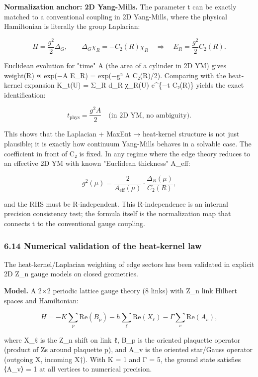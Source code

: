 \textbf{Normalization anchor: 2D Yang-Mills.} The parameter t can be exactly matched to a conventional coupling in 2D Yang-Mills, where the physical Hamiltonian is literally the group Laplacian:

\[
H = \frac{g^2}{2} \Delta_G, \qquad
\Delta_G \chi_R = -C_2(R) \chi_R
\quad \Rightarrow \quad
E_R = \frac{g^2}{2} C_2(R).
\]

Euclidean evolution for "time" A (the area of a cylinder in 2D YM) gives weight(R) ∝ exp(−A E\_R) = exp(−g² A C₂(R)/2). Comparing with the heat-kernel expansion K\_t(U) = Σ\_R d\_R χ\_R(U) e\^{}\{−t C₂(R)\} yields the exact identification:

\[
t_\mathrm{phys} = \frac{g^2 A}{2} \quad \text{(in 2D YM, no ambiguity).}
\]

This shows that the Laplacian + MaxEnt → heat-kernel structure is not just plausible; it is exactly how continuum Yang-Mills behaves in a solvable case. The coefficient in front of C₂ is fixed. In any regime where the edge theory reduces to an effective 2D YM with known "Euclidean thickness" A\_eff:

\[
g^2(\mu) = \frac{2}{A_\mathrm{eff}(\mu)} \cdot \frac{\Delta_R(\mu)}{C_2(R)},
\]

and the RHS must be R-independent. This R-independence is an internal precision consistency test; the formula itself is the normalization map that connects t to the conventional gauge coupling.

\subsubsection{6.14 Numerical validation of the heat-kernel law}\label{614-numerical-validation-of-the-heat-kernel-law}

The heat-kernel/Laplacian weighting of edge sectors has been validated in explicit 2D Z\_n gauge models on closed geometries.

\textbf{Model.} A 2×2 periodic lattice gauge theory (8 links) with Z\_n link Hilbert spaces and Hamiltonian:

\[
H = -K \sum_p \mathrm{Re}(B_p) - h \sum_\ell \mathrm{Re}(X_\ell) - \Gamma \sum_v \mathrm{Re}(A_v),
\]

where X\_ℓ is the Z\_n shift on link ℓ, B\_p is the oriented plaquette operator (product of Z\textquotesingle s around plaquette p), and A\_v is the oriented star/Gauss operator (outgoing X, incoming X†). With K = 1 and Γ = 5, the ground state satisfies ⟨A\_v⟩ = 1 at all vertices to numerical precision.

